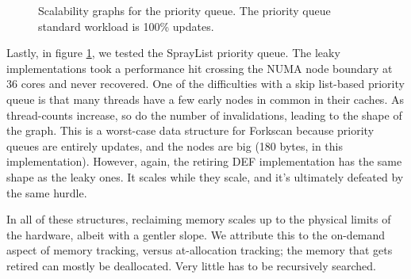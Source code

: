 \begin{figure}[tbp]
  \centering
  \caption{Scalability graphs for the priority queue.  The priority queue standard workload is 100\% updates.}
  \label{fig:priorityqueues}
\end{figure}

Lastly, in figure \ref{fig:priorityqueues}, we tested the SprayList priority queue.  The leaky implementations took a performance hit crossing the NUMA node boundary at 36 cores and never recovered.  One of the difficulties with a skip list-based priority queue is that many threads have a few early nodes in common in their caches.  As thread-counts increase, so do the number of invalidations, leading to the shape of the graph.  This is a worst-case data structure for Forkscan because priority queues are entirely updates, and the nodes are big (180 bytes, in this implementation).  However, again, the retiring DEF implementation has the same shape as the leaky ones.  It scales while they scale, and it's ultimately defeated by the same hurdle.

In all of these structures, reclaiming memory scales up to the physical limits of the hardware, albeit with a gentler slope.  We attribute this to the on-demand aspect of memory tracking, versus at-allocation tracking; the memory that gets retired can mostly be deallocated.  Very little has to be recursively searched.

